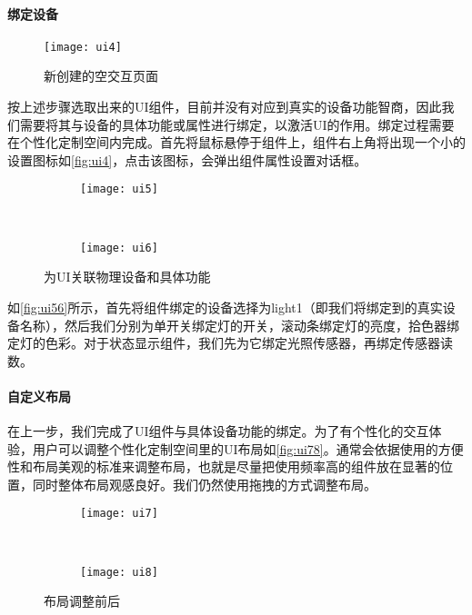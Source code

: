 \paragraph{绑定设备}

\begin{figure}[htbp]
	\centering
	\texttt{[image: ui4]}
	\caption{新创建的空交互页面}
	\label{fig:ui4}
\end{figure}

按上述步骤选取出来的UI组件，目前并没有对应到真实的设备功能智商，因此我们需要将其与设备的具体功能或属性进行绑定，以激活UI的作用。绑定过程需要在个性化定制空间内完成。首先将鼠标悬停于组件上，组件右上角将出现一个小的设置图标如\autoref{fig:ui4}，点击该图标，会弹出组件属性设置对话框。

\begin{figure}[htbp]
	\centering
	\begin{subfigure}{.48\linewidth}
		\texttt{[image: ui5]}
		\caption{}
	\end{subfigure}
	\ 
	\begin{subfigure}{.44\linewidth}
		\texttt{[image: ui6]}
		\caption{}
	\end{subfigure}
	\caption{为UI关联物理设备和具体功能}\label{fig:ui56}
\end{figure}

如\autoref{fig:ui56}所示，首先将组件绑定的设备选择为light1（即我们将绑定到的真实设备名称），然后我们分别为单开关绑定灯的开关，滚动条绑定灯的亮度，拾色器绑定灯的色彩。对于状态显示组件，我们先为它绑定光照传感器，再绑定传感器读数。

\paragraph{自定义布局}
在上一步，我们完成了UI组件与具体设备功能的绑定。为了有个性化的交互体验，用户可以调整个性化定制空间里的UI布局如\autoref{fig:ui78}。通常会依据使用的方便性和布局美观的标准来调整布局，也就是尽量把使用频率高的组件放在显著的位置，同时整体布局观感良好。我们仍然使用拖拽的方式调整布局。

\begin{figure}[htbp]
	\centering
	\begin{subfigure}{.65\linewidth}
		\texttt{[image: ui7]}
		\caption{}
	\end{subfigure}
	\ 
	\begin{subfigure}{.65\linewidth}
		\texttt{[image: ui8]}
		\caption{}
	\end{subfigure}
	\caption{布局调整前后}\label{fig:ui78}
\end{figure}

